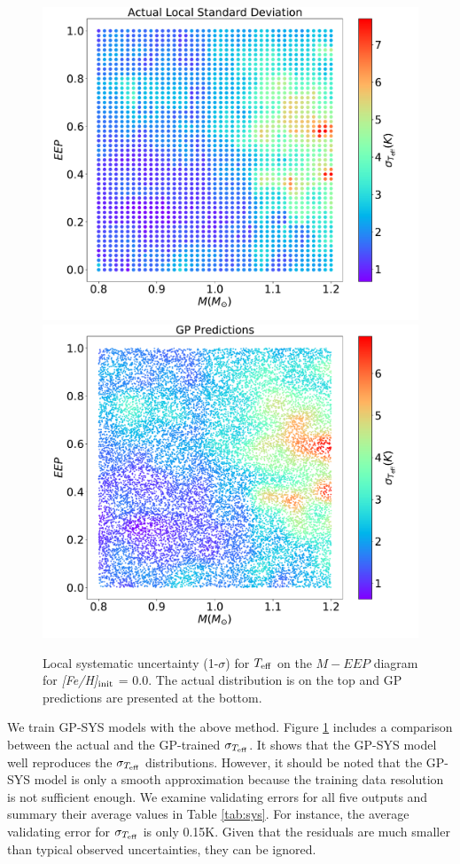 \begin{figure}
	\includegraphics[width=1.0\columnwidth]{5d_sys_teff.pdf}
	\includegraphics[width=1.0\columnwidth]{5d_sys_effective_T_std_predictions.pdf}
    \caption{Local systematic uncertainty (1-$\sigma$) for $T_{\rm eff}$ on the $M - EEP$ diagram for {\it [Fe/H]}$_{\rm init}$ = 0.0. The actual distribution is on the top and GP predictions are presented at the bottom.} 
  \label{fig:5d_sys_teff}
\end{figure}

We train GP-SYS models with the above method. Figure \ref{fig:5d_sys_teff} includes a comparison between the actual and the GP-trained $\sigma_{T_{\rm eff}}$. It shows that the GP-SYS model well reproduces the $\sigma_{T_{\rm eff}}$ distributions. However, it should be noted that the GP-SYS model is only a smooth approximation because the training data resolution is not sufficient enough. We examine validating errors for all five outputs and summary their average values in Table \ref{tab:sys}. For instance, the average validating error for $\sigma_{T_{\rm eff}}$ is only 0.15K. Given that the residuals are much smaller than typical observed uncertainties, they can be ignored.  


